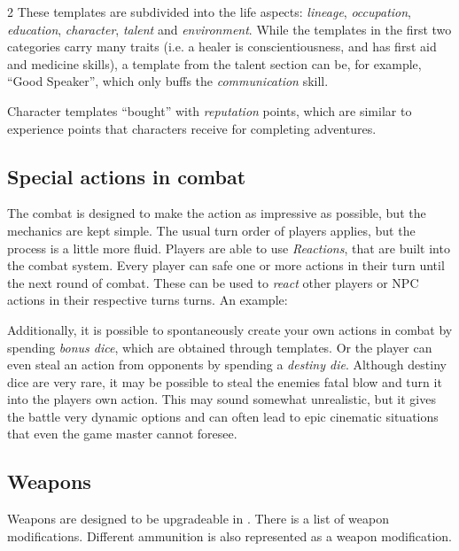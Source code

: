 \begin{multicols}{2}
These templates are subdivided into the life aspects: \textit{lineage}, \textit{occupation}, \textit{education}, \textit{character}, \textit{talent} and \textit{environment}. While the templates in the first two categories carry many traits (i.e. a healer is conscientiousness, and has first aid and medicine skills), a template from the talent section can be, for example, ``Good Speaker'', which only buffs the \textit{communication} skill.

Character templates ``bought'' with \textit{reputation} points, which are similar to experience points that characters receive for completing adventures.

\subsection{Special actions in combat} 

The combat is designed to make the action as impressive as possible, but the mechanics are kept simple. The usual turn order of players applies, but the process is a little more fluid. Players are able to use \textit{Reactions}, that are built into the combat system. Every player can safe one or more actions in their turn until the next round of combat. These can be used to \textit{react} other players or NPC actions in their respective turns turns. An example: 

Additionally, it is possible to spontaneously create your own actions in combat by spending \textit{bonus dice}, which are obtained through templates. Or the player can even steal an action from opponents by spending a \textit{destiny die}. Although destiny dice are very rare, it may be possible to steal the enemies fatal blow and turn it into the players own action. This may sound somewhat unrealistic, but it gives the battle very dynamic options and can often lead to epic cinematic situations that even the game master cannot foresee.

\subsection{Weapons} 

Weapons are designed to be upgradeable in . There is a list of weapon modifications. Different ammunition is also represented as a weapon modification.



\end{multicols}
